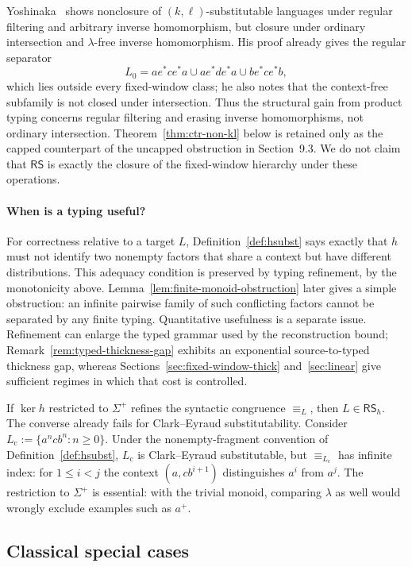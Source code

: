 \documentclass[11pt,a4paper]{article}
\theoremstyle{remark}
\theoremstyle{plain}
\begin{document}
Yoshinaka~\cite[Proposition~1]{yoshinaka2008} shows nonclosure of
$(k,\ell)$-substitutable languages under regular filtering and arbitrary
inverse homomorphism, but closure under ordinary intersection and
$\lambda$-free inverse homomorphism.  His proof already gives the regular
separator
\[
L_0=ae^*ce^*a\cup ae^*de^*a\cup be^*ce^*b,
\]
which lies outside every fixed-window class; he also notes that the
context-free subfamily is not closed under intersection.  Thus the structural
gain from product typing concerns regular filtering and erasing inverse
homomorphisms, not ordinary intersection.  Theorem~\ref{thm:ctr-non-kl} below
is retained only as the capped counterpart of the uncapped obstruction in
Section~9.3.  We do not claim that $\mathsf{RS}$ is exactly the closure of
the fixed-window hierarchy under these operations.

\paragraph{When is a typing useful?}
For correctness relative to a target $L$, Definition~\ref{def:hsubst} says
exactly that $h$ must not identify two nonempty factors that share a context
but have different distributions.  This adequacy condition is preserved by
typing refinement, by the monotonicity above.  Lemma~\ref{lem:finite-monoid-obstruction}
later gives a simple obstruction: an infinite pairwise family of such
conflicting factors cannot be separated by any finite typing.  Quantitative
usefulness is a separate issue.  Refinement can enlarge the typed grammar used
by the reconstruction bound; Remark~\ref{rem:typed-thickness-gap} exhibits an
exponential source-to-typed thickness gap, whereas
Sections~\ref{sec:fixed-window-thick} and~\ref{sec:linear} give sufficient
regimes in which that cost is controlled.

If $\ker h$ restricted to $\Sigma^+$ refines the syntactic congruence
$\equiv_L$, then $L\in\mathsf{RS}_h$.  The converse already fails for
Clark--Eyraud substitutability.  Consider
$L_{\mathrm c}:=\{a^ncb^n:n\ge0\}$.  Under the nonempty-fragment
convention of Definition~\ref{def:hsubst}, $L_{\mathrm c}$ is Clark--Eyraud substitutable,
but $\equiv_{L_{\mathrm c}}$ has infinite index: for $1\le i<j$ the
context $(a,cb^{i+1})$ distinguishes $a^i$ from $a^j$.  The restriction to $\Sigma^+$ is essential: with the trivial monoid,
comparing $\lambda$ as well would wrongly exclude examples such as $a^+$.

\subsection{Classical special cases}
\end{document}
